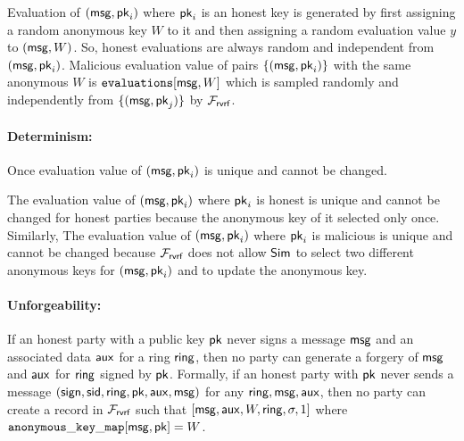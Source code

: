 	
	Evaluation of $ (\mathsf{msg}, \mathsf{pk}_i) $ where $ \mathsf{pk}_i $ is an honest key is generated by first assigning a random anonymous key $ W $ to it and then assigning a random evaluation value $ y $ to $ (\mathsf{msg}, W)$. So, honest evaluations are always random and independent from $ (\mathsf{msg},\mathsf{pk}_i) $. Malicious evaluation value of pairs $ \{(\mathsf{msg}, \mathsf{pk}_i)\} $ with the same anonymous $ W $ is $ \texttt{evaluations}[\mathsf{msg},W] $ which is sampled randomly and independently from $ \{(\mathsf{msg},\mathsf{pk}_j)\} $ by $ \mathcal{F}_{\textsf{rvrf}} $.
	
	
	
	
	\paragraph{Determinism:} Once evaluation value  of $ (\mathsf{msg}, \mathsf{pk}_i) $ is unique and  cannot be changed. 
	
	The evaluation value of $ (\mathsf{msg}, \mathsf{pk}_i) $ where $ \mathsf{pk}_i $ is honest is unique and cannot be changed for honest parties because the anonymous key of it selected only once. Similarly, The evaluation value of $ (\mathsf{msg}, \mathsf{pk}_i) $ where $ \mathsf{pk}_i $ is malicious is unique and cannot be changed because $ \mathcal{F}_{\textsf{rvrf}} $ does not allow $ \mathsf{Sim} $ to select two different anonymous keys for  $ (\mathsf{msg}, \mathsf{pk}_i) $ and to update the anonymous key.
	
	\paragraph{Unforgeability:}  If an honest party with a public key $ \mathsf{pk} $ never signs a message $ \mathsf{msg} $  and an associated data $ \mathsf{aux} $ for a ring $ \mathsf{ring} $, then no party can generate a  forgery of $ \mathsf{msg} $ and $ \mathsf{aux} $ for $ \mathsf{ring} $ signed by $ \mathsf{pk} $. Formally, if an honest party with $ \mathsf{pk} $ never sends a message $(\mathsf{sign}, \textsf{sid}, \mathsf{ring}, \mathsf{pk},\mathsf{aux}, \mathsf{msg})$ for any $ \mathsf{ring}, \mathsf{msg}, \mathsf{aux} $, then  no party can create a record in $ \mathcal{F}_{\textsf{rvrf}} $ such that $ [\mathsf{msg}, \mathsf{aux},W,\mathsf{ring}, \sigma, 1] $ where $ \mathtt{anonymous\_key\_map}[\mathsf{msg},\mathsf{pk}] = W $.
	
